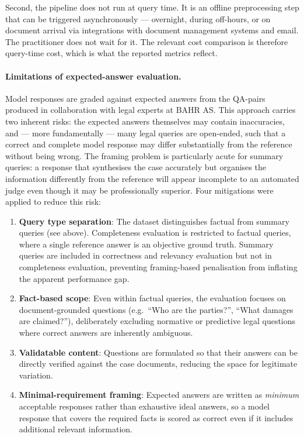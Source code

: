 Second, the pipeline does not run at query time. It is an offline preprocessing step
that can be triggered asynchronously --- overnight, during off-hours, or on document
arrival via integrations with document management systems and email. The practitioner
does not wait for it. The relevant cost comparison is therefore query-time cost, which
is what the reported metrics reflect.

\paragraph{Limitations of expected-answer evaluation.}
Model responses are graded against expected answers from the QA-pairs produced in collaboration with legal experts at BAHR AS. This approach carries two inherent risks: the expected answers themselves may contain inaccuracies, and --- more fundamentally --- many legal queries are open-ended, such that a correct and complete model response may differ substantially from the reference without being wrong. The framing problem is particularly acute for summary queries: a response that synthesises the case accurately but organises the information differently from the reference will appear incomplete to an automated judge even though it may be professionally superior. Four mitigations were applied to reduce this risk:
\begin{enumerate}
    \item \textbf{Query type separation}: The dataset distinguishes factual from summary queries (see above). Completeness evaluation is restricted to factual queries, where a single reference answer is an objective ground truth. Summary queries are included in correctness and relevancy evaluation but not in completeness evaluation, preventing framing-based penalisation from inflating the apparent performance gap.
    \item \textbf{Fact-based scope}: Even within factual queries, the evaluation focuses on document-grounded questions (e.g.\ ``Who are the parties?'', ``What damages are claimed?''), deliberately excluding normative or predictive legal questions where correct answers are inherently ambiguous.
    \item \textbf{Validatable content}: Questions are formulated so that their answers can be directly verified against the case documents, reducing the space for legitimate variation.
    \item \textbf{Minimal-requirement framing}: Expected answers are written as \emph{minimum} acceptable responses rather than exhaustive ideal answers, so a model response that covers the required facts is scored as correct even if it includes additional relevant information.
\end{enumerate}

